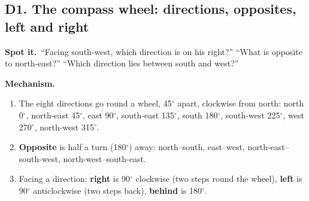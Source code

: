 \documentclass[11pt,a4paper]{article}
\let\oldsubsection\subsection
\renewcommand{\subsection}{\needspace{9\baselineskip}\oldsubsection}
\newcommand{\spot}{\textbf{\color{ember}Spot it.}\ }
\newcommand{\mech}{\textbf{\color{ember}Mechanism.}\ }
\begin{document}
\subsection{D1. The compass wheel: directions, opposites, left and right}
\spot ``Facing south-west, which direction is on his right?'' ``What is opposite to north-east?'' ``Which direction lies between south and west?''

\mech
\begin{enumerate}
\item The eight directions go round a wheel, 45$^\circ$ apart, clockwise from north: north 0$^\circ$, north-east 45$^\circ$, east 90$^\circ$, south-east 135$^\circ$, south 180$^\circ$, south-west 225$^\circ$, west 270$^\circ$, north-west 315$^\circ$.
\item \textbf{Opposite} is half a turn (180$^\circ$) away: north--south, east--west, north-east--south-west, north-west--south-east.
\item Facing a direction: \textbf{right} is 90$^\circ$ clockwise (two steps round the wheel), \textbf{left} is 90$^\circ$ anticlockwise (two steps back), \textbf{behind} is 180$^\circ$.
\end{enumerate}
\end{document}
